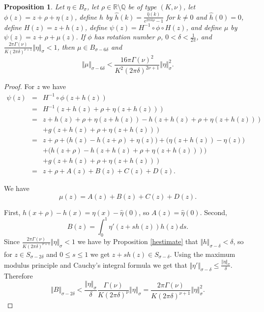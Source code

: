 \documentclass{article}
\newcommand{\norm}[1]{\Vert #1 \Vert}
\newtheorem{prop}[theorem]{Proposition}
\begin{document}
\begin{prop}
\label{muestimate}
Let $\eta \in B_\sigma$, let $\rho \in \mathbb{R} \setminus \mathbb{Q}$ be of type $(K,\nu)$,  
let $\phi(z)=z+\rho+\eta(z)$, 
define $h$ by
$\widehat{h}(k)=\frac{\widehat{\eta}(k)}{e^{2\pi i k\rho}-1}$ for $k \neq 0$ and $\widehat{h}(0)=0$,
define $H(z)=z+h(z)$,
define $\psi(z)=H^{-1} \circ \phi \circ H(z)$, and define $\mu$ by $\psi(z)=z+\rho+\mu(z)$. If $\phi$ has rotation number $\rho$,
$0<\delta<\frac{1}{2\pi}$,
and
$\frac{2\pi \Gamma(\nu)}{K(2\pi \delta)^{\nu+1}}\norm{\eta}_{\sigma}<1$,
then $\mu \in B_{\sigma-6\delta}$ and
\[
\norm{\mu}_{\sigma-6\delta} < \frac{16\pi \Gamma(\nu)^2}{K^2(2\pi \delta)^{2\nu+1}} \norm{\eta}_\sigma^2.
\]
\end{prop}
\begin{proof}
For $z$ we have 
\begin{eqnarray*}
\psi(z)&=&H^{-1} \circ \phi (z+h(z))\\
&=&H^{-1}(z+h(z)+\rho+\eta(z+h(z)))\\
&=&z+h(z)+\rho+\eta(z+h(z))-h(z+h(z)+\rho+\eta(z+h(z)))\\
&&+g(z+h(z)+\rho+\eta(z+h(z)))\\
&=&z+\rho+\Big(h(z)-h(z+\rho)+\eta(z)\Big)+\Big(\eta(z+h(z))-\eta(z)\Big)\\
&&+\Big(h(z+\rho)-h(z+h(z)+\rho+\eta(z+h(z)))\Big)\\
&&+g(z+h(z)+\rho+\eta(z+h(z)))\\
&=&z+\rho+A(z)+B(z)+C(z)+D(z).
\end{eqnarray*}

We have
\[
\mu(z)=A(z)+B(z)+C(z)+D(z).
\]

First, $h(x+\rho)-h(x)=\eta(x)-\widehat{\eta}(0)$, so $A(z)=\widehat{\eta}(0)$.
Second,
\[
B(z)=\int_0^1 \eta'(z+sh(z))h(z)ds.
\]
Since $\frac{2\pi \Gamma(\nu)}{K(2\pi \delta)^{\nu+1}}\norm{\eta}_{\sigma}<1$ we have by Proposition \ref{hestimate}
that $\norm{h}_{\sigma-\delta}<\delta$, so for $z \in S_{\sigma-2\delta}$ and $0 \leq s \leq 1$ we get
$z+sh(z) \in S_{\sigma-\delta}$.  Using the maximum modulus principle and Cauchy's integral formula we get that $\norm{\eta'}_{\sigma-\delta} \leq \frac{\norm{\eta}_\sigma}{\delta}$. 
Therefore
\[
\norm{B}_{\sigma-2\delta}< \frac{\norm{\eta}_\sigma}{\delta} \frac{\Gamma(\nu)}{K(2\pi \delta)^\nu}\norm{\eta}_\sigma=\frac{2\pi \Gamma(\nu)}{K(2\pi\delta)^{\nu+1}}\norm{\eta}_\sigma^2.
\]


\end{proof}
\end{document}
